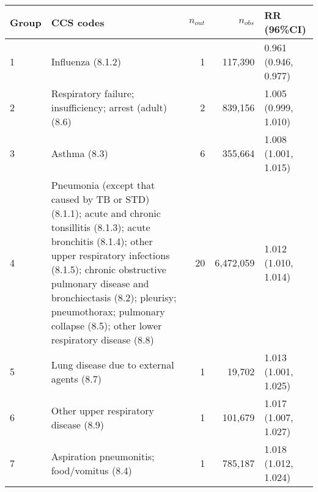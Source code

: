 \begin{tabular}{lp{6.5cm}rrp{2.2cm}}
  \hline
Group & CCS codes & $n_{out}$ & $n_{obs}$ & RR (96\%CI) \\ 
  \hline
   1 & Influenza (8.1.2) &    1 & 117,390 & 0.961 (0.946, 0.977) \\ 
     2 & Respiratory failure; insufficiency; arrest (adult) (8.6) &    2 & 839,156 & 1.005 (0.999, 1.010) \\ 
     3 & Asthma (8.3) &    6 & 355,664 & 1.008 (1.001, 1.015) \\ 
     4 & Pneumonia (except that caused by TB or STD) (8.1.1); acute and chronic tonsillitis (8.1.3); acute bronchitis (8.1.4); other upper respiratory infections (8.1.5); chronic obstructive pulmonary disease and bronchiectasis (8.2); pleurisy; pneumothorax; pulmonary collapse (8.5); other lower respiratory disease (8.8) &   20 & 6,472,059 & 1.012 (1.010, 1.014) \\ 
     5 & Lung disease due to external agents (8.7) &    1 & 19,702 & 1.013 (1.001, 1.025) \\ 
     6 & Other upper respiratory disease (8.9) &    1 & 101,679 & 1.017 (1.007, 1.027) \\ 
     7 & Aspiration pneumonitis; food/vomitus (8.4) &    1 & 785,187 & 1.018 (1.012, 1.024) \\ 
   \hline
\end{tabular}

